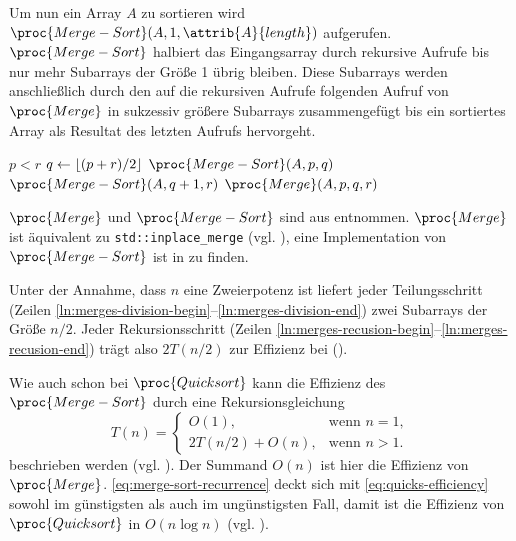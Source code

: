 Um nun ein Array $A$ zu sortieren wird $\proc{Merge-Sort}(A, 1, \attrib{A}{length})$ aufgerufen. $\proc{Merge-Sort}$ halbiert das Eingangsarray durch rekursive Aufrufe bis nur mehr Subarrays der Größe 1 übrig bleiben. Diese Subarrays werden anschließlich durch den auf die rekursiven Aufrufe folgenden Aufruf von $\proc{Merge}$ in sukzessiv größere Subarrays zusammengefügt bis ein sortiertes Array als Resultat des letzten Aufrufs hervorgeht.

\begin{codebox}
    \li \If $p < r$
    \li     \Do
                $q \gets \left\lfloor (p + r) / 2 \right\rfloor$\label{ln:merges-division-begin}
    \li         $\proc{Merge-Sort}(A, p, q)$\label{ln:merges-recusion-begin}
    \li         $\proc{Merge-Sort}(A, q + 1, r)$\label{ln:merges-division-end}\label{ln:merges-recusion-end}
    \li         $\proc{Merge}(A, p, q, r)$
            \End
\end{codebox}

$\proc{Merge}$ und $\proc{Merge-Sort}$ sind aus \cite[33f]{clrs2001} entnommen. $\proc{Merge}$ ist äquivalent zu \lstinline{std::inplace_merge} (vgl. \cite[929]{ISO-C++17}), eine Implementation von $\proc{Merge-Sort}$ ist in  zu finden.

Unter der Annahme, dass $n$ eine Zweierpotenz ist liefert jeder Teilungsschritt (Zeilen \ref{ln:merges-division-begin}--\ref{ln:merges-division-end}) zwei Subarrays der Größe $n / 2$. Jeder Rekursionsschritt (Zeilen \ref{ln:merges-recusion-begin}--\ref{ln:merges-recusion-end}) trägt also $2T(n / 2)$ zur Effizienz bei (\cite[36]{clrs2001}).

Wie auch schon bei $\proc{Quicksort}$ kann die Effizienz des $\proc{Merge-Sort}$ durch eine Rekursionsgleichung
\begin{equation}\label{eq:merge-sort-recurrence}
    T(n) = \begin{cases}
        O(1), & \text{wenn $n = 1$},\\
        2T(n/2) + O(n), & \text{wenn $n > 1$}.
    \end{cases}
\end{equation}
beschrieben werden (vgl. \cite[36]{clrs2001}). Der Summand $O(n)$ ist hier die Effizienz von $\proc{Merge}$. \eqref{eq:merge-sort-recurrence} deckt sich mit \eqref{eq:quicks-efficiency} sowohl im günstigsten als auch im ungünstigsten Fall, damit ist die Effizienz von $\proc{Quicksort}$ in $O(n \log n)$ (vgl. \cite[36]{clrs2001}).
